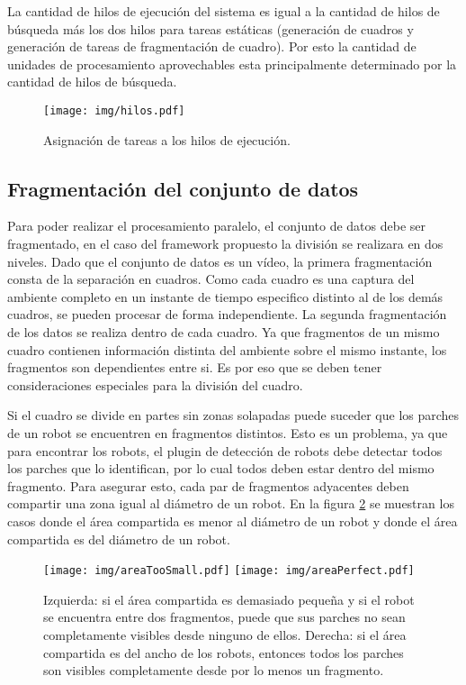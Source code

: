 La cantidad de hilos de ejecución del sistema es igual a la cantidad de hilos de
búsqueda más los dos hilos para tareas estáticas (generación de cuadros y
generación de tareas de fragmentación de cuadro). Por esto la cantidad de
unidades de procesamiento aprovechables esta principalmente determinado por la
cantidad de hilos de búsqueda.

\begin{figure}[!h]

	\texttt{[image: img/hilos.pdf]}

	\caption{Asignación de tareas a los hilos de ejecución.}

	\label{hilosFramework}

\end{figure}

\subsection{Fragmentación del conjunto de datos}

Para poder realizar el procesamiento paralelo, el conjunto de datos debe ser
fragmentado, en el caso del framework propuesto la división se realizara en
dos niveles. Dado que el conjunto de datos es un vídeo, la primera
fragmentación consta de la separación en cuadros. Como cada cuadro es una
captura del ambiente completo en un instante de tiempo especifico distinto al de
los demás cuadros, se pueden procesar de forma independiente. La segunda
fragmentación de los datos se realiza dentro de cada cuadro. Ya que fragmentos
de un mismo cuadro contienen información distinta del ambiente sobre el mismo
instante, los fragmentos son dependientes entre si. Es por eso que se deben
tener consideraciones especiales para la división del cuadro.

Si el cuadro se divide en partes sin zonas solapadas puede suceder que los
parches de un robot se encuentren en fragmentos distintos. Esto es un problema,
ya que para encontrar los robots, el plugin de detección de robots debe detectar
todos los parches que lo identifican, por lo cual todos deben estar dentro del
mismo fragmento. Para asegurar esto, cada par de fragmentos adyacentes deben
compartir una zona igual al diámetro de un robot. En la figura
\ref{areaCompartida} se muestran los casos donde el área compartida es menor al
diámetro de un robot y donde el área compartida es del diámetro de un robot.

\begin{figure}[!h]

	\centering
	\texttt{[image: img/areaTooSmall.pdf]}
	\texttt{[image: img/areaPerfect.pdf]}

	\caption{Izquierda: si el área compartida es demasiado pequeña y si el
	robot se encuentra entre dos fragmentos, puede que sus parches no sean
	completamente visibles desde ninguno de ellos. Derecha: si el área
	compartida es del ancho de los robots, entonces todos los parches son
	visibles completamente desde por lo menos un fragmento.}

	\label{areaCompartida}

\end{figure}


